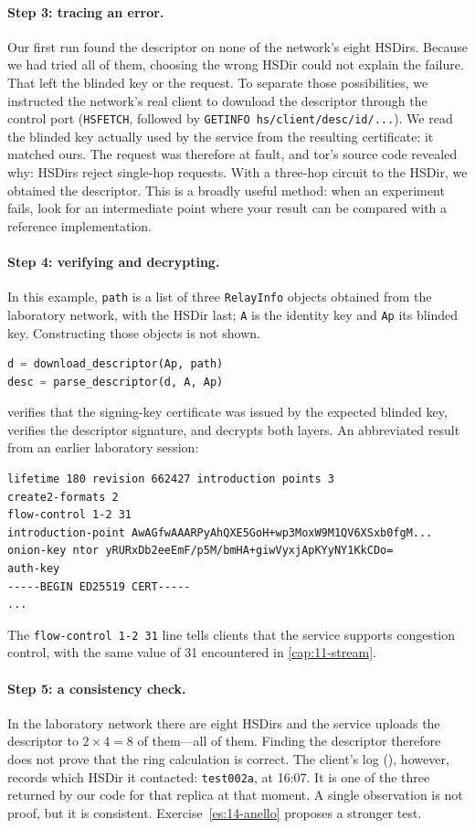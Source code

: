 \paragraph{Step 3: tracing an error.} Our first run found the descriptor on none of the network's eight HSDirs. Because we had tried all of them, choosing the wrong HSDir could not explain the failure. That left the blinded key or the request. To separate those possibilities, we instructed the network's real client to download the descriptor through the control port (\texttt{HSFETCH}, followed by \texttt{GETINFO hs/client/desc/id/...}). We read the blinded key actually used by the service from the resulting certificate: it matched ours. The request was therefore at fault, and tor's source code revealed why: HSDirs reject single-hop requests. With a three-hop circuit to the HSDir, we obtained the descriptor. This is a broadly useful method: when an experiment fails, look for an intermediate point where your result can be compared with a reference implementation.

\paragraph{Step 4: verifying and decrypting.} In this example, \texttt{path} is a list of three \texttt{RelayInfo} objects obtained from the laboratory network, with the HSDir last; \texttt{A} is the identity key and \texttt{Ap} its blinded key. Constructing those objects is not shown.
\begin{lstlisting}[language=Python]
d = download_descriptor(Ap, path)
desc = parse_descriptor(d, A, Ap)
\end{lstlisting}
 verifies that the signing-key certificate was issued by the expected blinded key, verifies the descriptor signature, and decrypts both layers. An abbreviated result from an earlier laboratory session:
\begin{lstlisting}[numbers=none]
lifetime 180 revision 662427 introduction points 3
create2-formats 2
flow-control 1-2 31
introduction-point AwAGfwAAARPyAhQXE5GoH+wp3MoxW9M1QV6XSxb0fgM...
onion-key ntor yRURxDb2eeEmF/p5M/bmHA+giwVyxjApKYyNY1KkCDo=
auth-key
-----BEGIN ED25519 CERT-----
...
\end{lstlisting}
The \texttt{flow-control 1-2 31} line tells clients that the service supports congestion control, with the same  value of 31 encountered in \cref{cap:11-stream}.

\paragraph{Step 5: a consistency check.} In the laboratory network there are eight HSDirs and the service uploads the descriptor to $2 \times 4 = 8$ of them---all of them. Finding the descriptor therefore does not prove that the ring calculation is correct. The client's log (), however, records which HSDir it contacted: \texttt{test002a}, at 16:07. It is one of the three returned by our code for that replica at that moment. A single observation is not proof, but it is consistent. Exercise~\ref{es:14-anello} proposes a stronger test.

